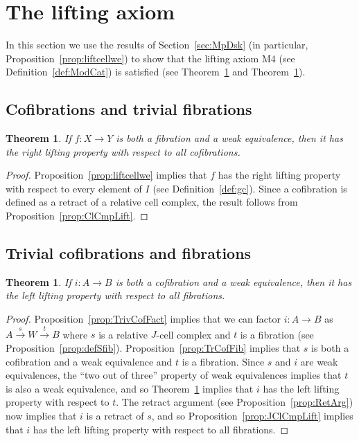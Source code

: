 \documentclass[12pt]{amsart}
\numberwithin{equation}{section}
\theoremstyle{slplain}
\newtheorem{thm}[equation]{Theorem}  %
\theoremstyle{definition}
\theoremstyle{remark}
\newcommand{\thmref}{Theorem~\ref}
\newcommand{\propref}{Proposition~\ref}
\newcommand{\defref}{Definition~\ref}
\newcommand{\secref}{Section~\ref}
\begin{document}
\section{The lifting axiom}
\label{sec:lift}

In this section we use the results of \secref{sec:MpDsk} (in
particular, \propref{prop:liftcellwe}) to show that the lifting axiom
M4 (see \defref{def:ModCat}) is satisfied (see \thmref{thm:onelift}
and \thmref{thm:otherlift}).

\subsection{Cofibrations and trivial fibrations}
\label{sec:CofTFib}


\begin{thm}
  \label{thm:onelift}
  If $f\colon X \to Y$ is both a fibration and a weak equivalence,
  then it has the right lifting property with respect to all
  cofibrations.
\end{thm}

\begin{proof}
  \propref{prop:liftcellwe} implies that $f$ has the right lifting
  property with respect to every element of $I$ (see \defref{def:gc}).
  Since a cofibration is defined as a retract of a relative cell
  complex, the result follows from \propref{prop:ClCmpLift}.
\end{proof}

\subsection{Trivial cofibrations and fibrations}
\label{sec:FibTCof}

\begin{thm}
  \label{thm:otherlift}
  If $i\colon A \to B$ is both a cofibration and a weak equivalence,
  then it has the left lifting property with respect to all
  fibrations.
\end{thm}

\begin{proof}
  \propref{prop:TrivCofFact} implies that we can factor $i\colon A \to
  B$ as $A\xrightarrow{s} W \xrightarrow{t} B$ where $s$ is a relative
  $J$-cell complex and $t$ is a fibration (see
  \propref{prop:defSfib}).  \propref{prop:TrCofFib} implies that $s$
  is both a cofibration and a weak equivalence and $t$ is a fibration.
  Since $s$ and $i$ are weak equivalences, the ``two out of three''
  property of weak equivalences implies that $t$ is also a weak
  equivalence, and so \thmref{thm:onelift} implies that $i$ has the
  left lifting property with respect to $t$.  The retract argument
  (see \propref{prop:RetArg}) now implies that $i$ is a retract of
  $s$, and so \propref{prop:JClCmpLift} implies that $i$ has the left
  lifting property with respect to all fibrations.
\end{proof}
\end{document}

